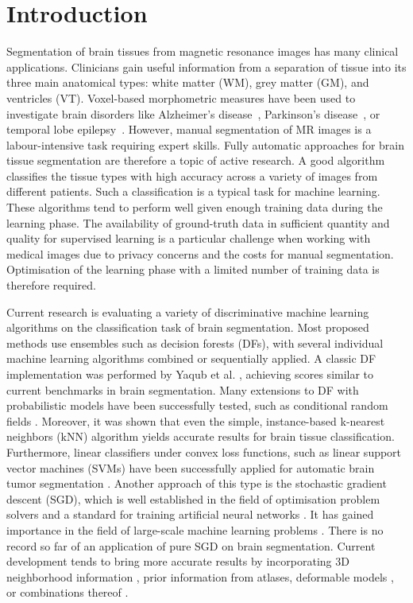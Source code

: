 \documentclass[journal]{IEEEtran}
\begin{document}
\section{Introduction}\label{s.introduction}
Segmentation of brain tissues from magnetic resonance images has many clinical applications. Clinicians gain useful information from a separation of tissue into its three main anatomical types: white matter (WM), grey matter (GM), and ventricles (VT). Voxel-based morphometric measures have been used to investigate brain disorders like Alzheimer’s disease~\cite{busatto2003voxel}, Parkinson's disease~\cite{price2004voxel}, or temporal lobe epilepsy~\cite{rummel2017personalized}. However, manual segmentation of MR images is a labour-intensive task requiring expert skills. Fully automatic approaches for brain tissue segmentation are therefore a topic of active research. A good algorithm classifies the tissue types with high accuracy across a variety of images from different patients. Such a classification is a typical task for machine learning. These algorithms tend to perform well given enough training data during the learning phase. The availability of ground-truth data in sufficient quantity and quality for supervised learning is a particular challenge when working with medical images due to privacy concerns and the costs for manual segmentation. Optimisation of the learning phase with a limited number of training data is therefore required.

Current research is evaluating a variety of discriminative machine learning algorithms on the classification task of brain segmentation. Most proposed methods use ensembles such as decision forests (DFs), with several individual machine learning algorithms combined or sequentially applied. A classic DF implementation was performed by Yaqub et al. \cite{Yaqub2014}, achieving scores similar to current benchmarks in brain segmentation. Many extensions to DF with probabilistic models have been successfully tested, such as conditional random fields \cite{Pereira2016}. Moreover, it was shown that even the simple, instance-based k-nearest neighbors (kNN) algorithm yields accurate results \cite{Anbeek2004,Cocosco2003,Warfield2000} for brain tissue classification. Furthermore, linear classifiers under convex loss functions, such as linear support vector machines (SVMs) have been successfully applied for automatic brain tumor segmentation \cite{Bauer2011}. Another approach of this type is the stochastic gradient descent (SGD), which is well established in the field of optimisation problem solvers and a standard for training artificial neural networks \cite{LeCun1998}. It has gained importance in the field of large-scale machine learning problems \cite{Bottou2010}. There is no record so far of an application of pure SGD on brain segmentation. Current development tends to bring more accurate results by incorporating 3D neighborhood information \cite{Li2011,Despotovic2013}, prior information from atlases\cite{Pohl2006,Ashburner2005}, deformable models \cite{Moreno2014}, or combinations thereof \cite{Ortiz2014}.
\end{document}
